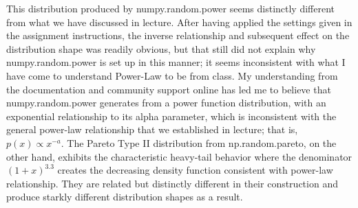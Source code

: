 This distribution produced by numpy.random.power seems distinctly different from what we have discussed in lecture. After having applied the settings given in the assignment instructions, the inverse relationship and subsequent effect on the distribution shape was readily obvious, but that still did not explain why numpy.random.power is set up in this manner; it seems inconsistent with what I have come to understand Power-Law to be from class. My understanding from the documentation and community support online has led me to believe that numpy.random.power generates from a power function distribution, with an exponential relationship to its alpha parameter, which is inconsistent with the general power-law relationship that we established in lecture; that is, $ p(x) \propto x^{-a} $. The Pareto Type II distribution from np.random.pareto, on the other hand, exhibits the characteristic heavy-tail behavior where the denominator $(1+x)^{3.3}$ creates the decreasing density function consistent with power-law relationship. They are related but distinctly different in their construction and produce starkly different distribution shapes as a result.

\newpage